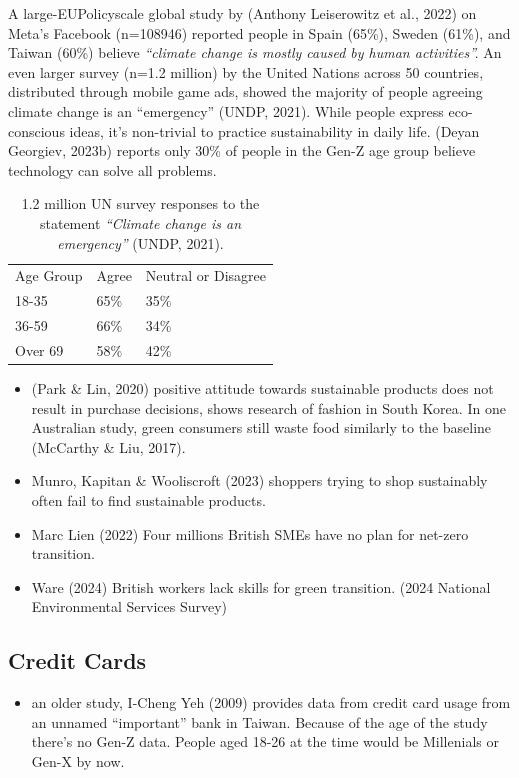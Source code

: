 \documentclass[
  letterpaper,
  DIV=11,
  numbers=noendperiod]{scrartcl}
\providecommand{\tightlist}{%
  \setlength{\itemsep}{0pt}\setlength{\parskip}{0pt}}\usepackage{longtable,booktabs,array}
\begin{document}
A large-EUPolicyscale global study by (Anthony Leiserowitz et al., 2022)
on Meta's Facebook (n=108946) reported people in Spain (65\%), Sweden
(61\%), and Taiwan (60\%) believe \emph{``climate change is mostly
caused by human activities''.} An even larger survey (n=1.2 million) by
the United Nations across 50 countries, distributed through mobile game
ads, showed the majority of people agreeing climate change is an
``emergency'' (UNDP, 2021). While people express eco-conscious ideas,
it's non-trivial to practice sustainability in daily life. (Deyan
Georgiev, 2023b) reports only 30\% of people in the Gen-Z age group
believe technology can solve all problems.

\begin{longtable}[]{@{}lll@{}}
\caption{1.2 million UN survey responses to the statement
\emph{``Climate change is an emergency''} (UNDP, 2021).}\tabularnewline
\toprule\noalign{}
\endfirsthead
\endhead
\bottomrule\noalign{}
\endlastfoot
Age Group & Agree & Neutral or Disagree \\
18-35 & 65\% & 35\% \\
36-59 & 66\% & 34\% \\
Over 69 & 58\% & 42\% \\
\end{longtable}

\begin{itemize}
\tightlist
\item
  (Park \& Lin, 2020) positive attitude towards sustainable products
  does not result in purchase decisions, shows research of fashion in
  South Korea. In one Australian study, green consumers still waste food
  similarly to the baseline (McCarthy \& Liu, 2017).
\item
  Munro, Kapitan \& Wooliscroft (2023) shoppers trying to shop
  sustainably often fail to find sustainable products.
\item
  Marc Lien (2022) Four millions British SMEs have no plan for net-zero
  transition.
\item
  Ware (2024) British workers lack skills for green transition. (2024
  National Environmental Services Survey)
\end{itemize}

\subsection{Credit Cards}\label{credit-cards}

\begin{itemize}
\tightlist
\item
  an older study, I-Cheng Yeh (2009) provides data from credit card
  usage from an unnamed ``important'' bank in Taiwan. Because of the age
  of the study there's no Gen-Z data. People aged 18-26 at the time
  would be Millenials or Gen-X by now.
\end{itemize}
\end{document}
